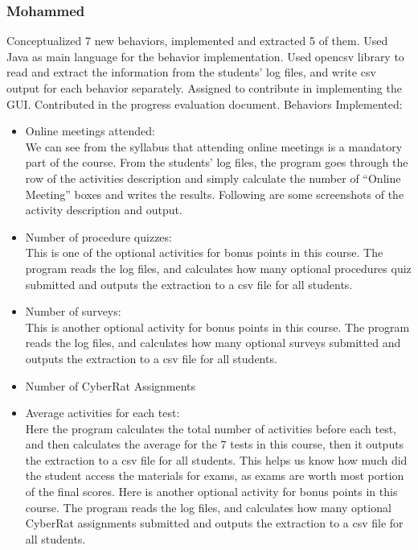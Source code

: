 \documentclass[12pt]{article}
\begin{document}
	\subsubsection{Mohammed}
Conceptualized 7 new behaviors, implemented and extracted 5 of them. Used Java as main language for the behavior implementation. Used opencsv library to read and extract the information from the students’ log files, and write csv output for each behavior separately. Assigned to contribute in implementing the GUI. Contributed in the progress evaluation document.
Behaviors Implemented:
\begin{itemize}
\item Online meetings attended: \\
We can see from the syllabus that attending online meetings is a mandatory part of the course. From the students’ log files, the program goes through the row of the activities description and simply calculate the number of “Online Meeting” boxes and writes the results. Following are some screenshots of the activity description and output.
\item Number of procedure quizzes: \\
This is one of the optional activities for bonus points in this course. The program reads the log files, and calculates how many optional procedures quiz submitted and outputs the extraction to a csv file for all students.
\item Number of surveys: \\
This is another optional activity for bonus points in this course. The program reads the log files, and calculates how many optional surveys submitted and outputs the extraction to a csv file for all students.
\item Number of CyberRat Assignments \\
\item Average activities for each test: \\
Here the program calculates the total number of activities before each test, and then calculates the average for the 7 tests in this course, then it outputs the extraction to a csv file for all students. This helps us know how much did the student access the materials for exams, as exams are worth most portion of the final scores.
Here is another optional activity for bonus points in this course. The program reads the log files, and calculates how many optional CyberRat assignments submitted and outputs the extraction to a csv file for all students.
\end{itemize}
\end{document}
